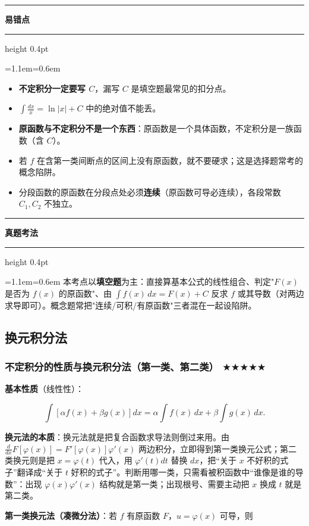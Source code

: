 \documentclass[11pt,openany,UTF8]{ctexbook}
\newcommand{\callouthead}[2]{%
  \par\addvspace{7pt}\noindent
  {\color{#1}\rule[-0.15em]{3pt}{1.05em}}\hspace{0.5em}%
  {\bfseries\color{#1}#2}\par\nobreak\vspace{-0.35em}%
  {\color{rulesep}\hrule height 0.4pt}\nobreak\vspace{0.45em}%
  \begingroup\small\setlength{\parindent}{0pt}%
  \leftskip=1.1em\rightskip=0.6em\noindent\ignorespaces}
\newcommand{\calloutend}{\par\endgroup\addvspace{7pt}}
\newenvironment{callwarn}[1]{\callouthead{warnbar}{#1}}{\calloutend}
\newenvironment{callexam}[1]{\callouthead{exambar}{#1}}{\calloutend}
\begin{document}
\begin{callwarn}{易错点}
\begin{itemize}
\item \textbf{不定积分一定要写 $C$}，漏写 $C$ 是填空题最常见的扣分点。
\item $\int\frac{dx}{x}=\ln\lvert x\rvert+C$ 中的绝对值不能丢。
\item \textbf{原函数与不定积分不是一个东西}：原函数是一个具体函数，不定积分是一族函数（含 $C$）。
\item 若 $f$ 在含第一类间断点的区间上没有原函数，就不要硬求；这是选择题常考的概念陷阱。
\item 分段函数的原函数在分段点处必须\textbf{连续}（原函数可导必连续），各段常数 $C_1,C_2$ 不独立。
\end{itemize}
\end{callwarn}

\begin{callexam}{真题考法}
本考点以\textbf{填空题}为主：直接算基本公式的线性组合、判定"$F(x)$ 是否为 $f(x)$ 的原函数"、由 $\int f(x)\,dx=F(x)+C$ 反求 $f$ 或其导数（对两边求导即可）。概念题常把"连续/可积/有原函数"三者混在一起设陷阱。

\end{callexam}

\subsection{换元积分法}

\subsubsection{不定积分的性质与换元积分法（第一类、第二类） $\bigstar$$\bigstar$$\bigstar$$\bigstar$$\bigstar$}

\textbf{基本性质}（线性性）：

\[\int\left[\alpha f(x)+\beta g(x)\right]dx=\alpha\int f(x)\,dx+\beta\int g(x)\,dx.\]

\textbf{换元法的本质}：换元法就是把复合函数求导法则倒过来用。由 $\frac{d}{dx}F[\varphi(x)]=F'[\varphi(x)]\varphi'(x)$ 两边积分，立即得到第一类换元公式；第二类换元则是把 $x=\varphi(t)$ 代入，用 $\varphi'(t)dt$ 替换 $dx$，把“关于 $x$ 不好积的式子”翻译成“关于 $t$ 好积的式子”。判断用哪一类，只需看被积函数中“谁像是谁的导数”：出现 $\varphi(x)\varphi'(x)$ 结构就是第一类；出现根号、需要主动把 $x$ 换成 $t$ 就是第二类。

\textbf{第一类换元法（凑微分法）}：若 $f$ 有原函数 $F$，$u=\varphi(x)$ 可导，则
\end{document}
